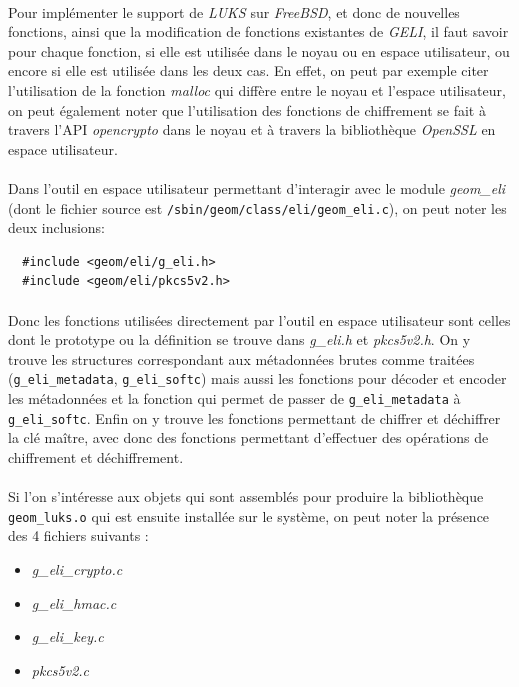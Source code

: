 \paragraph{}
Pour implémenter le support de {\em LUKS} sur {\em FreeBSD}, et donc de nouvelles
fonctions, ainsi que la modification de fonctions existantes de {\em GELI}, il
faut savoir pour chaque fonction, si elle est utilisée dans le noyau ou en espace
utilisateur, ou encore si elle est utilisée dans les deux cas. En effet, on peut
par exemple citer l'utilisation de la fonction {\em malloc} qui diffère entre
le noyau et l'espace utilisateur, on peut également noter que l'utilisation des
fonctions de chiffrement se fait à travers l'API {\em opencrypto} dans le noyau
et à travers la bibliothèque {\em OpenSSL} en espace utilisateur. 

\paragraph{}
Dans l'outil en espace utilisateur permettant d'interagir avec le module 
{\em geom\_eli} (dont le fichier source est
\texttt{/sbin/geom/class/eli/geom\_eli.c}), on peut noter les deux inclusions:
\begin{lstlisting}
  #include <geom/eli/g_eli.h>
  #include <geom/eli/pkcs5v2.h>
\end{lstlisting}

\paragraph{}
Donc les fonctions utilisées directement par l'outil en espace utilisateur sont
celles dont le prototype ou la définition se trouve dans {\em g\_eli.h} et
{\em pkcs5v2.h}. On y trouve les structures correspondant aux métadonnées brutes
comme traitées (\texttt{g\_eli\_metadata}, \texttt{g\_eli\_softc}) mais aussi
les fonctions pour décoder et encoder les métadonnées et la fonction qui permet
de passer de \texttt{g\_eli\_metadata} à \texttt{g\_eli\_softc}. Enfin on y
trouve les fonctions  permettant de chiffrer et déchiffrer la clé maître, avec
donc des fonctions permettant d'effectuer des opérations de chiffrement et
déchiffrement.

\paragraph{}
Si l'on s'intéresse aux objets qui sont assemblés pour produire la bibliothèque
\texttt{geom\_luks.o} qui est ensuite installée sur le système, on peut noter la
présence des 4 fichiers suivants :
\begin{itemize}
\item {\em g\_eli\_crypto.c}
\item {\em g\_eli\_hmac.c}
\item {\em g\_eli\_key.c}
\item {\em pkcs5v2.c}
\end{itemize}

